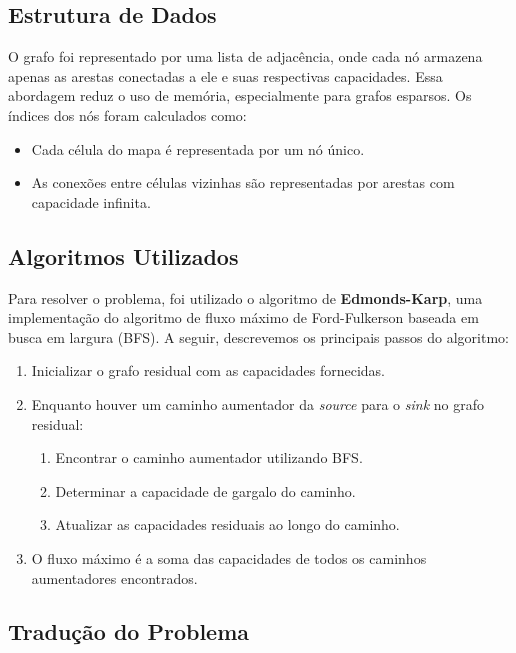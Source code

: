 \documentclass[a4paper,12pt]{article}
\begin{document}
\subsection*{Estrutura de Dados}

O grafo foi representado por uma lista de adjacência, onde cada nó armazena apenas as arestas conectadas a ele e suas respectivas capacidades. Essa abordagem reduz o uso de memória, especialmente para grafos esparsos. Os índices dos nós foram calculados como:
\begin{itemize}
    \item Cada célula do mapa é representada por um nó único.
    \item As conexões entre células vizinhas são representadas por arestas com capacidade infinita.
\end{itemize}

\subsection*{Algoritmos Utilizados}

Para resolver o problema, foi utilizado o algoritmo de \textbf{Edmonds-Karp},
uma implementação do algoritmo de fluxo máximo de Ford-Fulkerson baseada em
busca em largura (BFS). A seguir, descrevemos os principais passos do
algoritmo:

\begin{enumerate}
    \item Inicializar o grafo residual com as capacidades fornecidas.
    \item Enquanto houver um caminho aumentador da \textit{source} para o \textit{sink}
          no grafo residual:
          \begin{enumerate}
              \item Encontrar o caminho aumentador utilizando BFS.
              \item Determinar a capacidade de gargalo do caminho.
              \item Atualizar as capacidades residuais ao longo do caminho.
          \end{enumerate}
    \item O fluxo máximo é a soma das capacidades de todos os caminhos aumentadores
          encontrados.
\end{enumerate}

\subsection*{Tradução do Problema}
\end{document}
